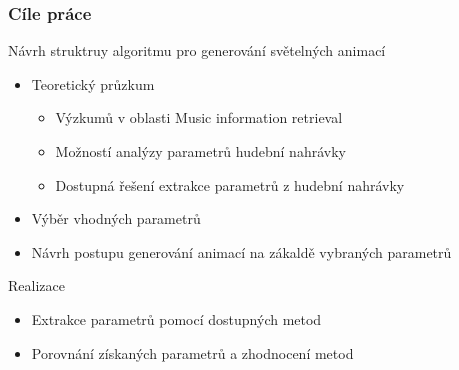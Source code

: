 \documentclass[%
  12pt,       				%
	t,                  %
	aspectratio=1610,   %
	unicode,						%
]{beamer}				    	%
\begin{document}
\disablenavigationsymbols

\maketitle

\begin{frame} 


	\frametitle{Cíle práce}
	\begin{block}{Návrh struktruy algoritmu pro generování světelných animací}
		\begin{itemize}
			\item Teoretický průzkum	
			\begin{itemize}
				\item Výzkumů v oblasti Music information retrieval
				\item Možností analýzy parametrů hudební nahrávky
				\item Dostupná řešení extrakce parametrů z hudební nahrávky
			\end{itemize}
			\item Výběr vhodných parametrů
			\item Návrh postupu generování animací na zákaldě vybraných parametrů
		\end{itemize}
	\end{block}
	\begin{block}{Realizace}
		\begin{itemize}
			\item Extrakce parametrů pomocí dostupných metod
			\item Porovnání získaných parametrů a zhodnocení metod
		\end{itemize}
	\end{block}
\end{frame}
\end{document}
